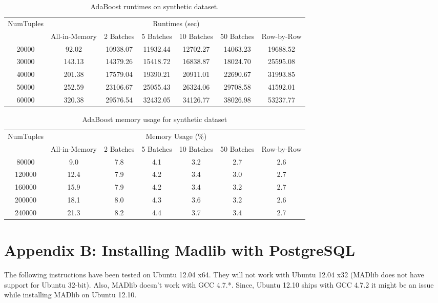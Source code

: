 \begin{table}[!htbp]
\small
\centering
\begin{tabular}{|c|c|c|c|c|c|c|}
\hline
\multirow{2}{*}{NumTuples} & \multicolumn{6}{|c|}{Runtimes (sec)}\\
\cline{2-7}
& All-in-Memory & 2 Batches & 5 Batches & 10 Batches & 50 Batches & Row-by-Row\\
\hline
20000&92.02 &10938.07 &11932.44 &12702.27 &14063.23 &19688.52 \\
\hline
30000&143.13 &14379.26 &15418.72 &16838.87 &18024.70 &25595.08 \\
\hline
40000&201.38 &17579.04 &19390.21 &20911.01 &22690.67 &31993.85 \\
\hline
50000&252.59 &23106.67 &25055.43 &26324.06 &29708.58 &41592.01 \\
\hline
60000&320.38 &29576.54 &32432.05 &34126.77 &38026.98 &53237.77 \\
\hline
\end{tabular}
\caption{AdaBoost runtimes on synthetic dataset.}
\label{tab:adaSynth1}
\end{table}

\begin{table}[!htbp]
\small
\centering
\begin{tabular}{|c|c|c|c|c|c|c|}
\hline
\multirow{2}{*}{NumTuples} & \multicolumn{6}{|c|}{Memory Usage (\%)}\\
\cline{2-7}
& All-in-Memory & 2 Batches & 5 Batches & 10 Batches & 50 Batches & Row-by-Row\\
\hline
80000& 9.0&7.8&4.1 &3.2 &2.7&2.6 \\
\hline
120000& 12.4&7.9 &4.2 &3.4&3.0 &2.7 \\
\hline
160000& 15.9&7.9 &4.2 &3.4 &3.2 &2.7 \\
\hline
200000& 18.1&8.0 &4.3 &3.6 &3.2 &2.6 \\
\hline
240000& 21.3&8.2 &4.4 &3.7 &3.4 &2.7 \\
\hline
\end{tabular}
\caption{AdaBoost memory usage for synthetic dataset}
\label{tab:adaSynth2}
\end{table}
\pagebreak
\section*{Appendix B: Installing Madlib with PostgreSQL}
The following instructions have been tested on Ubuntu 12.04 x64. They will not work with Ubuntu 12.04 x32 (MADlib does not have support for Ubuntu 32-bit). Also, MADlib doesn't work with GCC 4.7.*. Since,  Ubuntu 12.10 ships with GCC 4.7.2 it might be an issue while installing MADlib on Ubuntu 12.10.


